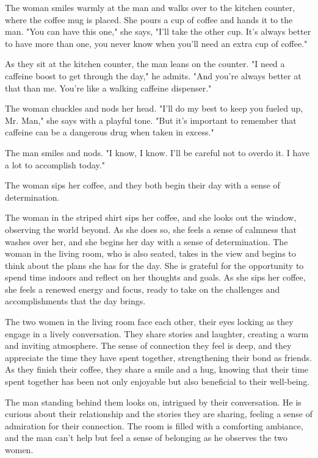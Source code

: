 \documentclass[smalldemyvopaper,11pt,twoside,onecolumn,openright,extrafontsizes]{memoir}
\begin{document}
The woman smiles warmly at the man and walks over to the kitchen counter, where the coffee mug is placed. She pours a cup of coffee and hands it to the man. "You can have this one," she says, "I'll take the other cup. It's always better to have more than one, you never know when you'll need an extra cup of coffee."\par
As they sit at the kitchen counter, the man leans on the counter. "I need a caffeine boost to get through the day," he admits. "And you're always better at that than me. You're like a walking caffeine dispenser."\par
The woman chuckles and nods her head. "I'll do my best to keep you fueled up, Mr. Man," she says with a playful tone. "But it's important to remember that caffeine can be a dangerous drug when taken in excess."\par
The man smiles and nods. "I know, I know. I'll be careful not to overdo it. I have a lot to accomplish today."\par
The woman sips her coffee, and they both begin their day with a sense of determination.\par
The woman in the striped shirt sips her coffee, and she looks out the window, observing the world beyond. As she does so, she feels a sense of calmness that washes over her, and she begins her day with a sense of determination. The woman in the living room, who is also seated, takes in the view and begins to think about the plans she has for the day. She is grateful for the opportunity to spend time indoors and reflect on her thoughts and goals. As she sips her coffee, she feels a renewed energy and focus, ready to take on the challenges and accomplishments that the day brings.\par
The two women in the living room face each other, their eyes locking as they engage in a lively conversation. They share stories and laughter, creating a warm and inviting atmosphere. The sense of connection they feel is deep, and they appreciate the time they have spent together, strengthening their bond as friends. As they finish their coffee, they share a smile and a hug, knowing that their time spent together has been not only enjoyable but also beneficial to their well-being.\par
The man standing behind them looks on, intrigued by their conversation. He is curious about their relationship and the stories they are sharing, feeling a sense of admiration for their connection. The room is filled with a comforting ambiance, and the man can't help but feel a sense of belonging as he observes the two women.\par
\end{document}
